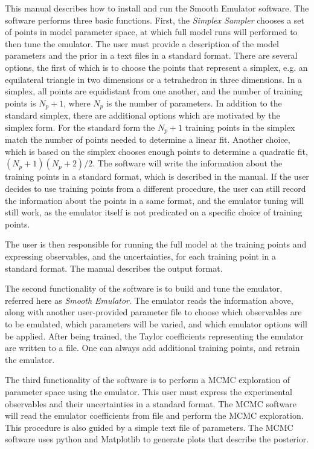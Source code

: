 \documentclass[12pt]{article}
\numberwithin{equation}{section}
\numberwithin{figure}{section}
\begin{document}
This manual describes how to install and run the Smooth Emulator software. The software performs three basic functions. First, the {\it Simplex Sampler} chooses a set of points in model parameter space, at which full model runs will performed to then tune the emulator. The user must provide a description of the model parameters and the prior in a text files in a standard format. There are several options, the first of which is to choose the points that represent a simplex, e.g. an equilateral triangle in two dimensions or a tetrahedron in three dimensions. In a simplex, all points are equidistant from one another, and the number of training points is $N_p+1$, where $N_p$ is the number of parameters. In addition to the standard simplex, there are additional options which are motivated by the simplex form. For the standard form the  $N_p+1$ training points in the simplex match the number of points needed to determine a linear fit. Another choice, which is based on the simplex chooses enough points to determine a quadratic fit, $(N_p+1)(N_p+2)/2$. The software will write the information about the training points in a standard format, which is described in the manual. If the user decides to use training points from a different procedure, the user can still record the information about the points in a same format, and the emulator tuning will still work, as the emulator itself is not predicated on a specific choice of training points.

 The user is then responsible for running the full model at the training points and expressing observables, and the uncertainties, for each training point in a standard format. The manual describes the output format.

 The second functionality of the software is to build and tune the emulator, referred here as {\it Smooth Emulator}. The emulator reads the information above, along with another user-provided parameter file to choose which observables are to be emulated, which parameters will be varied, and which emulator options will be applied. After being trained, the Taylor coefficients representing the emulator are written to a file. One can always add additional training points, and retrain the emulator. 

The third functionality of the software is to perform a MCMC exploration of parameter space using the emulator. This user must express the experimental observables and their uncertainties in a standard format. The MCMC software will read the emulator coefficients from file and perform the MCMC exploration. This procedure is also guided by a simple text file of parameters. The MCMC software uses python and Matplotlib to generate plots that describe the posterior. 


\newpage



\newpage



\newpage



\newpage



\newpage



\newpage



\newpage


\end{document}
